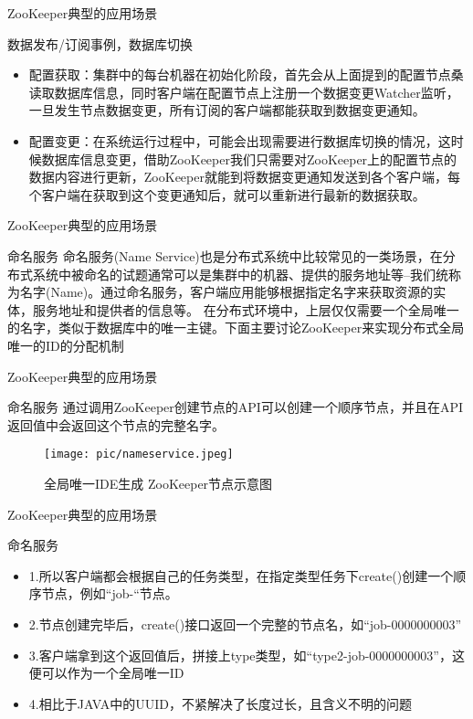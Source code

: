 \documentclass[10pt]{beamer}
\begin{document}
\begin{frame}[fragile]{ZooKeeper典型的应用场景}
  \begin{alertblock}{数据发布/订阅事例，数据库切换}
    \begin{itemize}
      \item 配置获取：集群中的每台机器在初始化阶段，首先会从上面提到的配置节点桑读取数据库信息，同时客户端在配置节点上注册一个数据变更Watcher监听，一旦发生节点数据变更，所有订阅的客户端都能获取到数据变更通知。
      \item 配置变更：在系统运行过程中，可能会出现需要进行数据库切换的情况，这时候数据库信息变更，借助ZooKeeper我们只需要对ZooKeeper上的配置节点的数据内容进行更新，ZooKeeper就能到将数据变更通知发送到各个客户端，每个客户端在获取到这个变更通知后，就可以重新进行最新的数据获取。
    \end{itemize}
  \end{alertblock}
\end{frame}

\begin{frame}[fragile]{ZooKeeper典型的应用场景}
  \begin{alertblock}{命名服务}
    命名服务(Name Service)也是分布式系统中比较常见的一类场景，在分布式系统中被命名的试题通常可以是集群中的机器、提供的服务地址等--我们统称为名字(Name)。通过命名服务，客户端应用能够根据指定名字来获取资源的实体，服务地址和提供者的信息等。
    在分布式环境中，上层仅仅需要一个全局唯一的名字，类似于数据库中的唯一主键。下面主要讨论ZooKeeper来实现分布式全局唯一的ID的分配机制
  \end{alertblock}
\end{frame}

\begin{frame}[fragile]{ZooKeeper典型的应用场景}
  \begin{alertblock}{命名服务}
    通过调用ZooKeeper创建节点的API可以创建一个顺序节点，并且在API返回值中会返回这个节点的完整名字。
    \begin{figure}
      \texttt{[image: pic/nameservice.jpeg]}
      \caption{全局唯一IDE生成 ZooKeeper节点示意图}
    \end{figure}
  \end{alertblock}
\end{frame}

\begin{frame}[fragile]{ZooKeeper典型的应用场景}
  \begin{alertblock}{命名服务}
    \begin{itemize}
      \item 1.所以客户端都会根据自己的任务类型，在指定类型任务下create()创建一个顺序节点，例如“job-“节点。
      \item 2.节点创建完毕后，create()接口返回一个完整的节点名，如“job-0000000003”
      \item 3.客户端拿到这个返回值后，拼接上type类型，如“type2-job-0000000003”，这便可以作为一个全局唯一ID
      \item 4.相比于JAVA中的UUID，不紧解决了长度过长，且含义不明的问题
    \end{itemize}
  \end{alertblock}
\end{frame}
\end{document}
